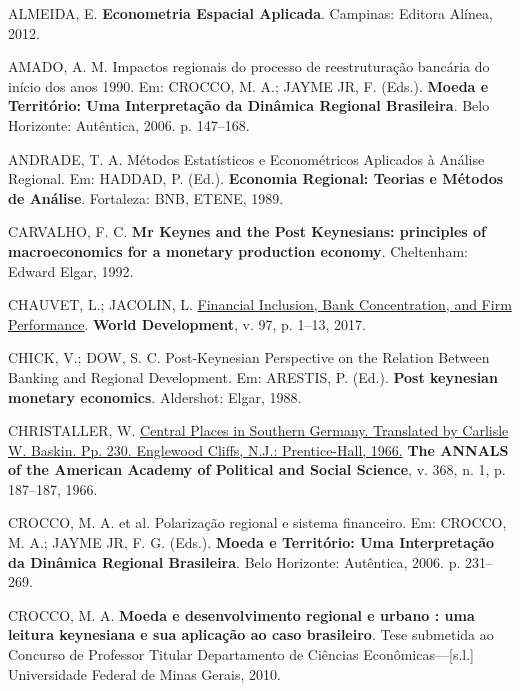 \documentclass[a4paper,12pt]{article}
\newlength{\cslhangindent}
\newlength{\cslentryspacingunit} %
\newenvironment{CSLReferences}[2] %
 {%
  \setlength{\parindent}{0pt}
  \ifodd #1
  \let\oldpar\par
  \def\par{\hangindent=\cslhangindent\oldpar}
  \fi
  \setlength{\parskip}{#2\cslentryspacingunit}
 }%
 {}
\begin{document}
\singlespacing

\hypertarget{refs}{}
\begin{CSLReferences}{0}{1}
\leavevmode{}%
ALMEIDA, E. \textbf{Econometria Espacial Aplicada}. Campinas: Editora
Alínea, 2012.

\leavevmode{}%
AMADO, A. M. Impactos regionais do processo de reestruturação bancária
do início dos anos 1990. Em: CROCCO, M. A.; JAYME JR, F. (Eds.).
\textbf{Moeda e Território: Uma Interpretação da Dinâmica Regional
Brasileira}. Belo Horizonte: Autêntica, 2006. p. 147--168.

\leavevmode{}%
ANDRADE, T. A. Métodos Estatísticos e Econométricos Aplicados à Análise
Regional. Em: HADDAD, P. (Ed.). \textbf{Economia Regional: Teorias e
Métodos de Análise}. Fortaleza: BNB, ETENE, 1989.

\leavevmode{}%
CARVALHO, F. C. \textbf{Mr Keynes and the Post Keynesians: principles of
macroeconomics for a monetary production economy}. Cheltenham: Edward
Elgar, 1992.

\leavevmode{}%
CHAUVET, L.; JACOLIN, L.
\href{https://doi.org/10.1016/j.worlddev.2017.03.018}{Financial
Inclusion, Bank Concentration, and Firm Performance}. \textbf{World
Development}, v. 97, p. 1--13, 2017.

\leavevmode{}%
CHICK, V.; DOW, S. C. Post-Keynesian Perspective on the Relation Between
Banking and Regional Development. Em: ARESTIS, P. (Ed.). \textbf{Post
keynesian monetary economics}. Aldershot: Elgar, 1988.

\leavevmode{}%
CHRISTALLER, W.
\href{https://doi.org/10.1177/000271626636800132}{Central Places in
Southern Germany. Translated by Carlisle W. Baskin. Pp. 230. Englewood
Cliffs, N.J.: Prentice-Hall, 1966.} \textbf{The ANNALS of the American
Academy of Political and Social Science}, v. 368, n. 1, p. 187--187,
1966.

\leavevmode{}%
CROCCO, M. A. et al. Polarização regional e sistema financeiro. Em:
CROCCO, M. A.; JAYME JR, F. G. (Eds.). \textbf{Moeda e Território: Uma
Interpretação da Dinâmica Regional Brasileira}. Belo Horizonte:
Autêntica, 2006. p. 231--269.

\leavevmode{}%
CROCCO, M. A. \textbf{Moeda e desenvolvimento regional e urbano : uma
leitura keynesiana e sua aplicação ao caso brasileiro}. Tese submetida
ao Concurso de Professor Titular Departamento de Ciências
Econômicas---{[}s.l.{]} Universidade Federal de Minas Gerais, 2010.


\end{CSLReferences}
\end{document}
